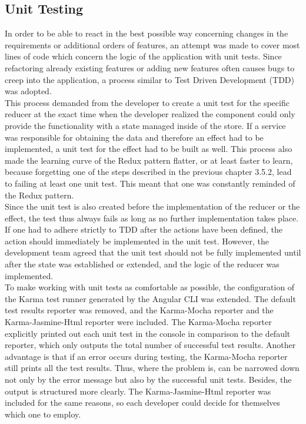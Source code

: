 \documentclass[Bachelor,BIF,english]{twbook}
\begin{document}
\subsection{Unit Testing}
In order to be able to react in the best possible way concerning changes in the requirements or additional orders of features, an attempt was made to cover most lines of code which concern the logic of the application with unit tests. Since refactoring already existing features or adding new features often causes bugs to creep into the application, a process similar to Test Driven Development (TDD) \cite{TDD} was adopted.
\\[\baselineskip]
This process demanded from the developer to create a unit test for the specific reducer at the exact time when the developer realized the component could only provide the functionality with a state managed inside of the store. If a service was responsible for obtaining the data and therefore an effect had to be implemented, a unit test for the effect had to be built as well. This process also made the learning curve of the Redux pattern flatter, or at least faster to learn, because forgetting one of the steps described in the previous chapter 3.5.2, lead to failing at least one unit test. This meant that one was constantly reminded of the Redux pattern. 
\\[\baselineskip]
Since the unit test is also created before the implementation of the reducer or the effect, the test thus always fails as long as no further implementation takes place. If one had to adhere strictly to TDD after the actions have been defined, the action should immediately be implemented in the unit test. However, the development team agreed that the unit test should not be fully implemented until after the state was established or extended, and the logic of the reducer was implemented.
\\[\baselineskip]
To make working with unit tests as comfortable as possible, the configuration of the Karma test runner \cite{Karma} generated by the Angular CLI was extended. The default test results reporter was removed, and the Karma-Mocha reporter \cite{KarmaMocha} and the Karma-Jasmine-Html \cite{KarmaJasmineHTML} reporter were included. The Karma-Mocha reporter explicitly printed out each unit test in the console in comparison to the default reporter, which only outputs the total number of successful test results. Another advantage is that if an error occurs during testing, the Karma-Mocha reporter still prints all the test results. Thus, where the problem is, can be narrowed down not only by the error message but also by the successful unit tests. Besides, the output is structured more clearly. The Karma-Jasmine-Html reporter was included for the same reasons, so each developer could decide for themselves which one to employ.
\end{document}
